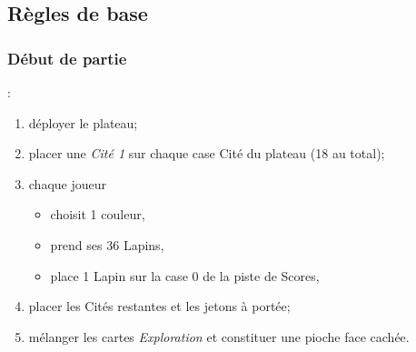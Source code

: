 \documentclass[11pt]{beamer}
\begin{document}
\subsection{Règles de base}

	\begin{frame}
		\frametitle{Début de partie}
		
		:
		\begin{enumerate}
			\item déployer le plateau;
			\item placer une \emph{Cité 1} sur chaque case Cité du plateau (18 au total);
			\item chaque joueur
				\begin{itemize}
					\item choisit 1 couleur,
					\item prend ses 36 Lapins,
					\item place 1 Lapin sur la case 0 de la piste de Scores,
				\end{itemize}
			\item placer les Cités restantes et les jetons à portée;
			\item mélanger les cartes \emph{Exploration} et constituer une pioche face cachée.
		\end{enumerate}
	
%	
	\end{frame}
\end{document}

